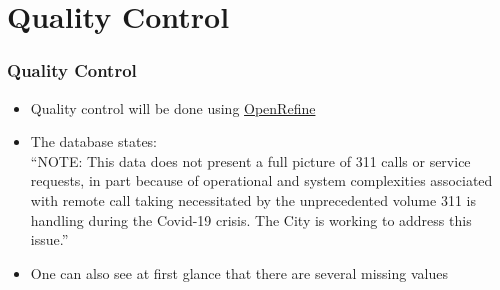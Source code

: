 \documentclass{beamer}
\begin{document}
\section{Quality Control}
\begin{frame}
\frametitle{Quality Control}

\begin{itemize}
\item Quality control will be done using \href{https://openrefine.org/}{OpenRefine}
\vfill
\item The database states:\\
``NOTE: This data does not present a full picture of 311 calls or service requests, in part because of operational and system complexities associated with remote call taking necessitated by the unprecedented volume 311 is handling during the Covid-19 crisis. The City is working to address this issue.''
\vfill
\item One can also see at first glance that there are several missing values
\end{itemize}
\end{frame}
\end{document}
